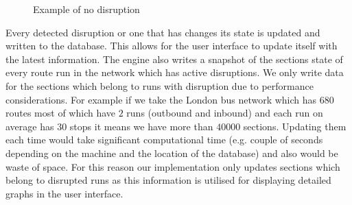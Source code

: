 \begin{figure}[ht]
	\caption{Example of no disruption}
	\label{fig:example2}
\end{figure}

Every detected disruption or one that has changes its state is updated and written to the database. This allows for the user interface to update itself with the latest information. The engine also writes a snapshot of the sections state of every route run in the network which has active disruptions. We only write data for the sections which belong to runs with disruption due to performance considerations. For example if we take the London bus network which has $680$ routes most of which have $2$ runs (outbound and inbound) and each run on average has $30$ stops it means we have more than $40000$ sections. Updating them each time would take significant computational time (e.g. couple of seconds depending on the machine and the location of the database) and also would be waste of space. For this reason our implementation only updates sections which belong to disrupted runs as this information is utilised for displaying detailed graphs in the user interface.


